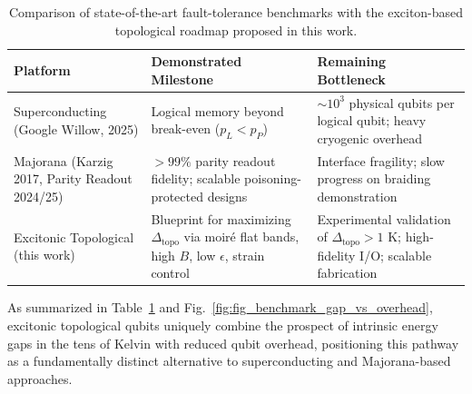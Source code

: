 \documentclass[aps,prl,twocolumn,superscriptaddress]{revtex4-2}
\begin{document}
\begin{table}[t]
\centering
\caption{Comparison of state-of-the-art fault-tolerance benchmarks with the exciton-based topological roadmap proposed in this work.}
\begin{tabular}{p{3.1cm} p{2.2cm} p{2.8cm}}
\hline
\textbf{Platform} & \textbf{Demonstrated Milestone} & \textbf{Remaining Bottleneck} \\
\hline
Superconducting (Google Willow, 2025) \cite{Willow2025} 
& Logical memory beyond break-even ($p_L < p_P$) 
& $\sim 10^3$ physical qubits per logical qubit; heavy cryogenic overhead \\[6pt]

Majorana (Karzig 2017, Parity Readout 2024/25) \cite{Karzig2017,Higginbotham2024,Frolov2025} 
& $>99\%$ parity readout fidelity; scalable poisoning-protected designs 
& Interface fragility; slow progress on braiding demonstration \\[6pt]

Excitonic Topological (this work) 
& Blueprint for maximizing $\Delta_{\text{topo}}$ via moiré flat bands, high $B$, low $\epsilon$, strain control 
& Experimental validation of $\Delta_{\text{topo}} > 1$ K; high-fidelity I/O; scalable fabrication \\
\hline
\end{tabular}
\label{tab:benchmarks}
\end{table}

As summarized in Table~\ref{tab:benchmarks} and Fig.~\ref{fig:fig_benchmark_gap_vs_overhead}, excitonic topological qubits uniquely combine the prospect of intrinsic energy gaps in the tens of Kelvin with reduced qubit overhead, positioning this pathway as a fundamentally distinct alternative to superconducting and Majorana-based approaches.
\end{document}
